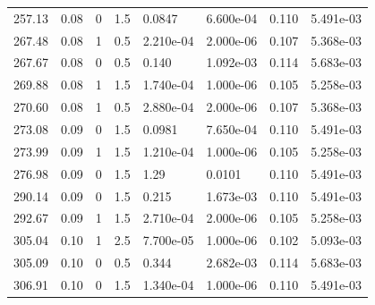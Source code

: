 \documentclass[preview]{standalone}
\begin{document}
{{{\begin{tabular}{L{1.2cm}C{1.2cm} C{0.3cm}C{0.5cm} C{1.4cm}C{1.4cm} C{1.4cm}C{1.4cm}}
  257.13  &  0.08  & 0     & 1.5 &  0.0847  & 6.600e-04  & 0.110 &  5.491e-03   \\ 
  267.48  &  0.08  & 1     & 0.5 &  2.210e-04  & 2.000e-06  & 0.107 &  5.368e-03   \\ 
  267.67  &  0.08  & 0     & 0.5 &  0.140  & 1.092e-03  & 0.114 &  5.683e-03   \\ 
  269.88  &  0.08  & 1     & 1.5 &  1.740e-04  & 1.000e-06  & 0.105 &  5.258e-03   \\ 
  270.60  &  0.08  & 1     & 0.5 &  2.880e-04  & 2.000e-06  & 0.107 &  5.368e-03   \\ 
  273.08  &  0.09  & 0     & 1.5 &  0.0981  & 7.650e-04  & 0.110 &  5.491e-03   \\ 
  273.99  &  0.09  & 1     & 1.5 &  1.210e-04  & 1.000e-06  & 0.105 &  5.258e-03   \\ 
  276.98  &  0.09  & 0     & 1.5 &  1.29  & 0.0101  & 0.110 &  5.491e-03   \\ 
  290.14  &  0.09  & 0     & 1.5 &  0.215  & 1.673e-03  & 0.110 &  5.491e-03   \\ 
  292.67  &  0.09  & 1     & 1.5 &  2.710e-04  & 2.000e-06  & 0.105 &  5.258e-03   \\ 
  305.04  &  0.10  & 1     & 2.5 &  7.700e-05  & 1.000e-06  & 0.102 &  5.093e-03   \\ 
  305.09  &  0.10  & 0     & 0.5 &  0.344  & 2.682e-03  & 0.114 &  5.683e-03   \\ 
  306.91  &  0.10  & 0     & 1.5 &  1.340e-04  & 1.000e-06  & 0.110 &  5.491e-03   \\ 
\hline 
\end{tabular} 

}}}
\end{document}
